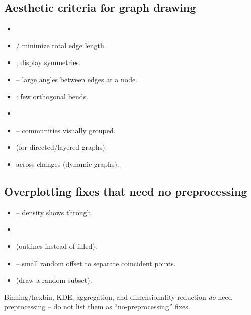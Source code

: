 \subsection{Aesthetic criteria for graph drawing}
\begin{itemize}[leftmargin=1.4em]
  \item {}
  \item {} / minimize total edge length.
  \item {}; display symmetries.
  \item {} -- large angles between edges at a node.
  \item {}; few orthogonal bends.
  \item {}
  \item {} -- communities visually grouped.
  \item {} (for directed/layered graphs).
  \item {} across changes (dynamic graphs).
\end{itemize}

\subsection{Overplotting fixes that need no preprocessing}
\begin{itemize}[leftmargin=1.4em]
  \item {} -- density shows through.
  \item {}
  \item {} (outlines instead of filled).
  \item {} -- small random offset to separate coincident points.
  \item {} (draw a random subset).
\end{itemize}
\begin{keybox}[Contrast]
Binning/hexbin, KDE, aggregation, and dimensionality reduction \emph{do} need
preprocessing -- do not list them as ``no-preprocessing'' fixes.
\end{keybox}

